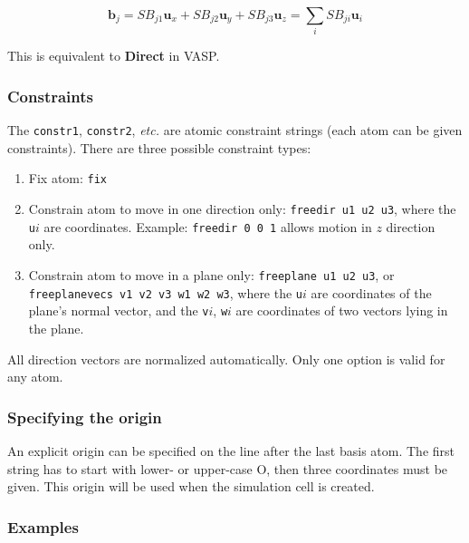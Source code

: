 \documentclass[a4paper,12pt,pdftex,onecolumn]{article}
\newcommand{\etc}{\emph{etc.}\xspace}
\begin{document}
\begin{equation}
\mathbf{b}_j = S B_{j1} \mathbf{u}_x
+ S B_{j2} \mathbf{u}_y
+ S B_{j3} \mathbf{u}_z
= \sum_i S B_{ji} \mathbf{u}_i
\end{equation}

This is equivalent to \textbf{Direct} in VASP.






\subsubsection{Constraints}

The \verb+constr1+, \verb+constr2+, \etc are atomic constraint strings
(each atom can be given constraints).
There are three possible constraint types:

\begin{enumerate}
\item Fix atom: \verb+fix+

\item Constrain atom to move in one direction only: \verb+freedir u1 u2 u3+,
where the \verb+u+$i$ are coordinates.
Example: \verb+freedir 0 0 1+ allows motion in $z$ direction only.

\item Constrain atom to move in a plane only: \verb+freeplane u1 u2 u3+, or
\newline
\verb+freeplanevecs v1 v2 v3 w1 w2 w3+,
where the \verb+u+$i$ are coordinates of the plane's normal vector, and
the \verb+v+$i$, \verb+w+$i$ are coordinates of two vectors lying in the plane.
\end{enumerate}

All direction vectors are normalized automatically. Only one option is valid for any
atom.






\subsubsection{Specifying the origin}

An explicit origin can be specified on the line after the last basis atom.
The first string has to start with lower- or upper-case O, then three coordinates
must be given. This origin will be used when the simulation cell is created.



\subsubsection{Examples}
\end{document}
